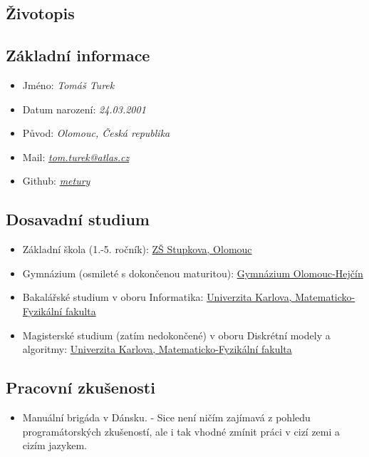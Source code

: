 \documentclass[12pt,a4paper]{article}
\begin{document}
\begin{center}
	\section*{Životopis}
\end{center}

\subsection*{Základní informace}

\begin{itemize}
	\item Jméno: \textit{Tomáš Turek}
	\item Datum narození: \textit{24.03.2001}
	\item Původ: \textit{Olomouc, Česká republika}
	\item Mail: \href{mailto:tom.turek@atlas.cz}{\textit{tom.turek@atlas.cz}}
	\item Github: \href{https://github.com/metury}{\textit{metury}}
\end{itemize}

\subsection*{Dosavadní studium}

\begin{itemize}
	\item Základní škola (1.-5. ročník): \href{https://zsstupkova.cz/}{ZŠ Stupkova, Olomouc}
	\item Gymnázium (osmileté s dokončenou maturitou): \href{https://www.gytool.cz/}{Gymnázium Olomouc-Hejčín}
	\item Bakalářské studium v oboru Informatika: \href{https://www.mff.cuni.cz/}{Univerzita Karlova, Matematicko-Fyzikální fakulta}
	\item Magisterské studium (zatím nedokončené) v oboru Diskrétní modely a algoritmy: \href{https://www.mff.cuni.cz/}{Univerzita Karlova, Matematicko-Fyzikální fakulta}
\end{itemize}

\subsection*{Pracovní zkušenosti}

\begin{itemize}
\item Manuální brigáda v Dánsku. - Sice není ničím zajímavá z pohledu programátorských zkušeností, ale i tak vhodné zmínit práci v cizí zemi a cizím jazykem.
\end{itemize}
\end{document}
